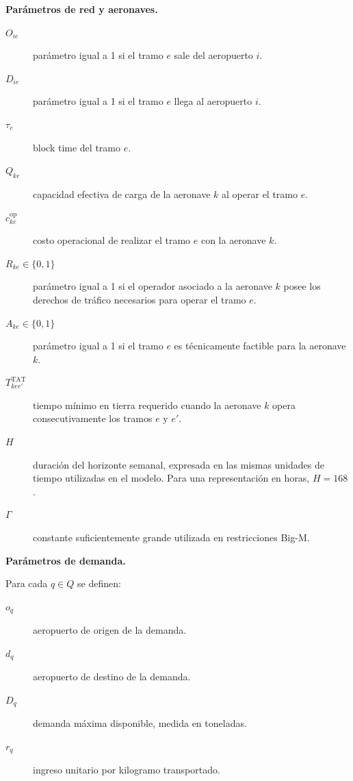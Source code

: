 \vspace{0.5em}
\noindent\textbf{Parámetros de red y aeronaves.}

\begin{description}

    \item[$O_{ie}$]
    parámetro igual a 1 si el tramo $e$ sale del aeropuerto $i$.

    \item[$D_{ie}$]
    parámetro igual a 1 si el tramo $e$ llega al aeropuerto $i$.

    \item[$\tau_e$]
    block time del tramo $e$.

    \item[$Q_{ke}$]
    capacidad efectiva de carga de la aeronave $k$ al operar el tramo $e$.

    \item[$c_{ke}^{\mathrm{op}}$]
    costo operacional de realizar el tramo $e$ con la aeronave $k$.

    \item[$R_{ke}\in\{0,1\}$]
    parámetro igual a 1 si el operador asociado a la aeronave $k$ posee los derechos de
    tráfico necesarios para operar el tramo $e$.

    \item[$A_{ke}\in\{0,1\}$]
    parámetro igual a 1 si el tramo $e$ es técnicamente factible para la aeronave $k$.

    \item[$T_{kee'}^{\mathrm{TAT}}$]
    tiempo mínimo en tierra requerido cuando la aeronave $k$ opera consecutivamente
    los tramos $e$ y $e'$.

    \item[$H$]
    duración del horizonte semanal, expresada en las mismas unidades de tiempo utilizadas
    en el modelo. Para una representación en horas, $H=168$.

    \item[$\Gamma$]
    constante suficientemente grande utilizada en restricciones Big-M.

\end{description}


\vspace{0.5em}
\noindent\textbf{Parámetros de demanda.}

Para cada $q\in Q$ se definen:

\begin{description}

    \item[$o_q$]
    aeropuerto de origen de la demanda.

    \item[$d_q$]
    aeropuerto de destino de la demanda.

    \item[$D_q$]
    demanda máxima disponible, medida en toneladas.

    \item[$r_q$]
    ingreso unitario por kilogramo transportado.

\end{description}

